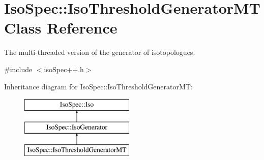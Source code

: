 \hypertarget{class_iso_spec_1_1_iso_threshold_generator_m_t}{}\section{Iso\+Spec\+:\+:Iso\+Threshold\+Generator\+MT Class Reference}
\label{class_iso_spec_1_1_iso_threshold_generator_m_t}


The multi-\/threaded version of the generator of isotopologues.  




{\ttfamily \#include $<$iso\+Spec++.\+h$>$}

Inheritance diagram for Iso\+Spec\+:\+:Iso\+Threshold\+Generator\+MT\+:\begin{figure}[H]
\begin{center}
\leavevmode
\includegraphics[height=3.000000cm]{class_iso_spec_1_1_iso_threshold_generator_m_t}
\end{center}
\end{figure}
